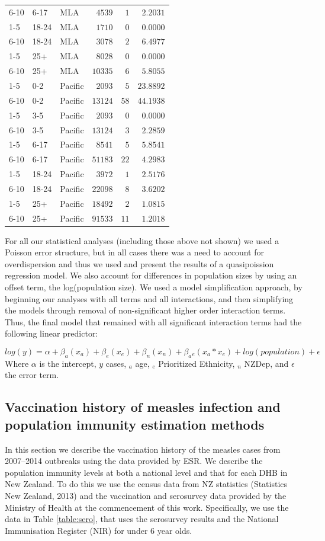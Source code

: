 \documentclass{article}
\begin{document}
\begin{itemize}
\begin{table}[hbtp]
\begin{center}
\begin{tabular}{lllrrr}
6-10&6-17&MLA&$   4539$&$  1$&$ 2.2031$\tabularnewline
1-5&18-24&MLA&$   1710$&$  0$&$ 0.0000$\tabularnewline
6-10&18-24&MLA&$   3078$&$  2$&$ 6.4977$\tabularnewline
1-5&25+&MLA&$   8028$&$  0$&$ 0.0000$\tabularnewline
6-10&25+&MLA&$  10335$&$  6$&$ 5.8055$\tabularnewline
1-5&0-2&Pacific&$   2093$&$  5$&$23.8892$\tabularnewline
6-10&0-2&Pacific&$  13124$&$ 58$&$44.1938$\tabularnewline
1-5&3-5&Pacific&$   2093$&$  0$&$ 0.0000$\tabularnewline
6-10&3-5&Pacific&$  13124$&$  3$&$ 2.2859$\tabularnewline
1-5&6-17&Pacific&$   8541$&$  5$&$ 5.8541$\tabularnewline
6-10&6-17&Pacific&$  51183$&$ 22$&$ 4.2983$\tabularnewline
1-5&18-24&Pacific&$   3972$&$  1$&$ 2.5176$\tabularnewline
6-10&18-24&Pacific&$  22098$&$  8$&$ 3.6202$\tabularnewline
1-5&25+&Pacific&$  18492$&$  2$&$ 1.0815$\tabularnewline
6-10&25+&Pacific&$  91533$&$ 11$&$ 1.2018$\tabularnewline
\hline
\end{tabular}\end{center}\label{table:percap}
\end{table}

For all our statistical analyses (including those above not shown) we used a Poisson error structure, but in all cases there was a need to account for overdispersion and thus we used and present the results of a quasipoission regression model. We also account for differences in population sizes by using an offset term, the log(population size). We used a model simplification approach, by beginning our analyses with all terms and all interactions, and then simplifying the models through removal of non-significant higher order interaction terms. Thus, the final model that remained with all significant interaction terms had the following linear predictor:

\begin{equation} \label{eq:reg}
 log(y) = \alpha + \beta _a (x_a)+ \beta _e(x_e)+ \beta _n (x_n) + \beta _a{}_e(x_a * x_e)+ log(population)  + \epsilon
  \end{equation}
Where $\alpha$ is the intercept, $y$ cases, $_a$ age, $_e$ Prioritized Ethnicity, $_n$ NZDep, and $\epsilon$ the error term.



\subsection{Vaccination history of measles infection and population immunity estimation methods}
\label{sub:immunestat}

In this section we describe the vaccination history of the measles cases from 2007--2014 outbreaks using the data provided by ESR. We describe the population immunity levels at both a national level and that for each DHB in New Zealand. To do this we use the census data from NZ statistics (Statistics New Zealand, 2013) and the vaccination and serosurvey data provided by the Ministry of Health at the commencement of this work. Specifically, we use the data in Table \ref{table:sero}, that uses the serosurvey results and the National Immunisation Register (NIR) for under 6 year olds.


\end{itemize}
\end{document}
